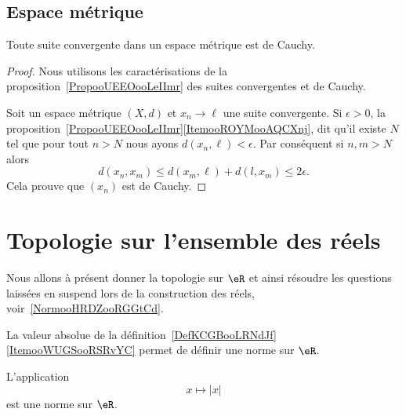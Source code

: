 \subsection{Espace métrique}

\begin{proposition}
    Toute suite convergente dans un espace métrique est de Cauchy.
\end{proposition}

\begin{proof}
    Nous utilisons les caractérisations de la proposition~\ref{PropooUEEOooLeIImr} des suites convergentes et de Cauchy.

    Soit un espace métrique \( (X,d)\) et \( x_n\to\ell\) une suite convergente. Si \( \epsilon>0\), la proposition~\ref{PropooUEEOooLeIImr}\ref{ItemooROYMooAQCXnj}, dit qu'il existe \( N\) tel que pour tout \( n>N\) nous ayons \( d(x_n,\ell)<\epsilon\). Par conséquent si \( n,m>N\) alors
    \begin{equation}
        d(x_n,x_m)\leq d(x_m,\ell)+d(l,x_m)\leq 2\epsilon.
    \end{equation}
    Cela prouve que \( (x_n)\) est de Cauchy.
\end{proof}

\section{Topologie sur l'ensemble des réels}
\label{SECooGKHYooMwHQaD}

Nous allons à présent donner la topologie sur \( \eR\) et ainsi résoudre les questions laissées en suspend lors de la construction des réels, voir~\ref{NormooHRDZooRGGtCd}.

La valeur absolue de la définition~\ref{DefKCGBooLRNdJf}\ref{ItemooWUGSooRSRvYC} permet de définir une norme sur \( \eR\).
\begin{lemma}
    L'application
    \begin{equation}
         x\mapsto | x |
    \end{equation}
     est une norme sur $\eR$.
\end{lemma}

